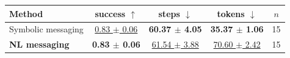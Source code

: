 \begin{tabular}{lcccc}
\toprule
Method & success $\uparrow$ & steps $\downarrow$ & tokens $\downarrow$ & $n$ \\
\midrule
Symbolic messaging & \underline{0.83 $\pm$ 0.06} & \textbf{60.37 $\pm$ 4.05} & \textbf{35.37 $\pm$ 1.06} & 15 \\
\textbf{NL messaging} & \textbf{0.83 $\pm$ 0.06} & \underline{61.54 $\pm$ 3.88} & \underline{70.60 $\pm$ 2.42} & 15 \\
\bottomrule
\end{tabular}
